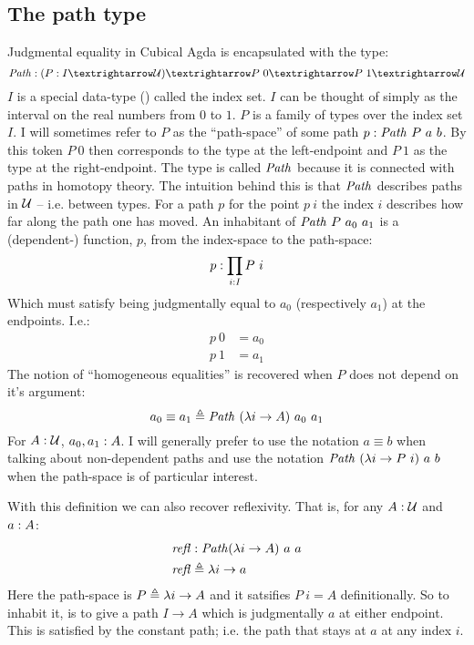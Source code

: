 \subsection{The path type}
Judgmental equality in Cubical Agda is encapsulated with the type:
%
\begin{equation}
\Path \tp (P \tp I → \MCU) → P\ 0 → P\ 1 → \MCU
\end{equation}
%
$I$ is a special data-type () called the index set. $I$ can be thought of simply as the interval on
the real numbers from $0$ to $1$. $P$ is a family of types over the index set
$I$. I will sometimes refer to $P$ as the ``path-space'' of some path $p \tp
\Path\ P\ a\ b$. By this token $P\ 0$ then corresponds to the type at the
left-endpoint and $P\ 1$ as the type at the right-endpoint. The type is called
$\Path$ because it is connected with paths in homotopy theory. The intuition
behind this is that $\Path$ describes paths in $\mathcal{U}$ -- i.e. between types. For
a path $p$ for the point $p\ i$ the index $i$ describes how far along the path
one has moved. An inhabitant of $\Path\ P\ a_0\ a_1$ is a (dependent-) function,
$p$, from the index-space to the path-space:
%
$$
p \mathrel{:} \prod_{i \mathrel{:} I} P\ i
$$
%
Which must satisfy being judgmentally equal to $a_0$ (respectively $a_1$) at the
endpoints. I.e.:
%
\begin{align*}
  p\ 0 & = a_0 \\
  p\ 1 & = a_1
\end{align*}
%
The notion of ``homogeneous equalities'' is recovered when $P$ does not depend
on it's argument:
%
$$
a_0 \equiv a_1 \defeq \Path\ (\lambda i \to A)\ a_0\ a_1
$$
%
For $A \mathrel{:} \mathcal{U}$, $a_0, a_1 \mathrel{:} A$. I will generally prefer to use the notation
$a \equiv b$ when talking about non-dependent paths and use the notation
$\Path\ (\lambda i \to P\ i)\ a\ b$ when the path-space is of particular
interest.

With this definition we can also recover reflexivity. That is, for any $A \mathrel{:}
\mathcal{U}$ and $a \mathrel{:} A$:
%
\begin{equation}
\begin{aligned}
\refl & \tp \Path (\lambda i \to A)\ a\ a \\
\refl & \defeq \lambda i \to a
\end{aligned}
\end{equation}
%
Here the path-space is $P \mathrel{\triangleq} \lambda i \to A$ and it satsifies $P\ i = A$
definitionally. So to inhabit it, is to give a path $I \to A$ which is
judgmentally $a$ at either endpoint. This is satisfied by the constant path;
i.e. the path that stays at $a$ at any index $i$.

